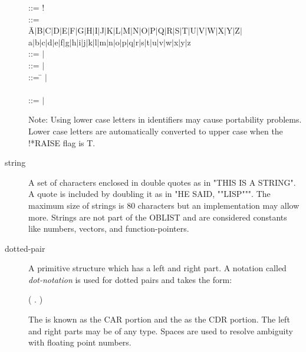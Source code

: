 \documentclass[11pt,letterpaper]{book}
\begin{document}
\begin{description}
\begin{tabbing}
 ::= ! \\
 ::= \\
\hspace*{.25in} \= A$\mid$B$\mid$C$\mid$D$\mid$E$\mid$F$\mid$G$\mid$H$
\mid$I$\mid$J$\mid$K$\mid$L$\mid$M$\mid$N$\mid$O$\mid$P$\mid$Q$\mid$R$
\mid$S$\mid$T$\mid$U$\mid$V$\mid$W$\mid$X$\mid$Y$\mid$Z$\mid$ \\
\> a$\mid$b$\mid$c$\mid$d$\mid$e$\mid$f$\mid$g$\mid$h$\mid$i$\mid$j$
\mid$k$\mid$l$\mid$m$\mid$n$\mid$o$\mid$p$\mid$q$\mid$r$\mid$s$\mid$t$
\mid$u$\mid$v$\mid$w$\mid$x$\mid$y$\mid$z \\
 ::= $\mid$ \\
 ::= $\mid$ \\
 ::= \=  $\mid$ \\
\>  \\
 ::= $\mid$
\end{tabbing}

Note: Using lower case letters in identifiers may cause portability
problems. Lower case letters are automatically converted to upper case
when the !*RAISE flag is T. 


\item[string]  A set of characters enclosed in double quotes as
in "THIS IS A STRING". A quote is included by doubling it as in "HE
SAID, ""LISP""". The maximum size of strings is 80 characters but an
implementation may allow more. Strings are not part of the OBLIST and
are considered constants like numbers, vectors, and function-pointers.

\item[dotted-pair] A primitive structure which has a left and right part.
 
A notation called {\em dot-notation} is used for dotted pairs and
takes the form:

\begin{tabbing}
( . )
\end{tabbing}

The  is known as the CAR portion and the 
as the CDR portion. The left and right parts may be of any type.
Spaces are used to resolve ambiguity with floating point numbers.



\end{description}
\end{document}
